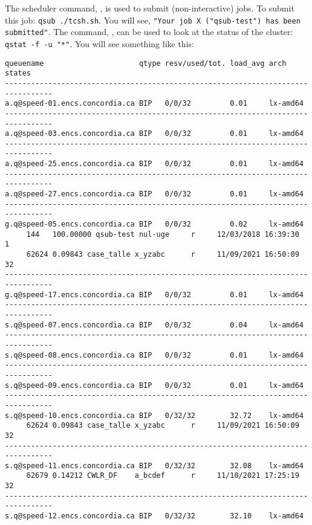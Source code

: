 \documentclass{easychair}
\begin{document}
The scheduler command, , is used to submit (non-interactive) jobs. 
To submit this job: \texttt{qsub ./tcsh.sh}. You will see, \texttt{"Your job 
X ("qsub-test") has been submitted"}. The command, , can be used 
to look at the status of the cluster: \texttt{qstat -f -u "*"}. You will see 
something like this: 

\small
\begin{verbatim}
queuename                      qtype resv/used/tot. load_avg arch          states
---------------------------------------------------------------------------------
a.q@speed-01.encs.concordia.ca BIP   0/0/32         0.01     lx-amd64
---------------------------------------------------------------------------------
a.q@speed-03.encs.concordia.ca BIP   0/0/32         0.01     lx-amd64
---------------------------------------------------------------------------------
a.q@speed-25.encs.concordia.ca BIP   0/0/32         0.01     lx-amd64
---------------------------------------------------------------------------------
a.q@speed-27.encs.concordia.ca BIP   0/0/32         0.01     lx-amd64
---------------------------------------------------------------------------------
g.q@speed-05.encs.concordia.ca BIP   0/0/32         0.02     lx-amd64
     144   100.00000 qsub-test nul-uge     r     12/03/2018 16:39:30    1 
     62624 0.09843 case_talle x_yzabc      r     11/09/2021 16:50:09    32
---------------------------------------------------------------------------------
g.q@speed-17.encs.concordia.ca BIP   0/0/32         0.01     lx-amd64
---------------------------------------------------------------------------------
s.q@speed-07.encs.concordia.ca BIP   0/0/32         0.04     lx-amd64
---------------------------------------------------------------------------------
s.q@speed-08.encs.concordia.ca BIP   0/0/32         0.01     lx-amd64
---------------------------------------------------------------------------------
s.q@speed-09.encs.concordia.ca BIP   0/0/32         0.01     lx-amd64
---------------------------------------------------------------------------------
s.q@speed-10.encs.concordia.ca BIP   0/32/32        32.72    lx-amd64
     62624 0.09843 case_talle x_yzabc      r     11/09/2021 16:50:09    32
---------------------------------------------------------------------------------
s.q@speed-11.encs.concordia.ca BIP   0/32/32        32.08    lx-amd64
     62679 0.14212 CWLR_DF    a_bcdef      r     11/10/2021 17:25:19    32
---------------------------------------------------------------------------------
s.q@speed-12.encs.concordia.ca BIP   0/32/32        32.10    lx-amd64

\end{verbatim}
\end{document}
